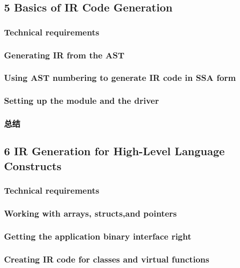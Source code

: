 \documentclass[11pt,a4paper,UTF8]{ctexart}
\begin{document}
	\subsection{5 Basics of IR Code Generation}
		\subsubsection{Technical requirements}
		\subsubsection{Generating IR from the AST}
		\subsubsection{Using AST numbering to generate IR code in SSA form}
		\subsubsection{Setting up the module and the driver}
		\subsubsection{总结}
	\subsection{6 IR Generation for High-Level Language Constructs}
		\subsubsection{Technical requirements}
		\subsubsection{Working with arrays, structs,and pointers}
		\subsubsection{Getting the application binary interface right}
		\subsubsection{Creating IR code for classes and virtual functions}
\end{document}
